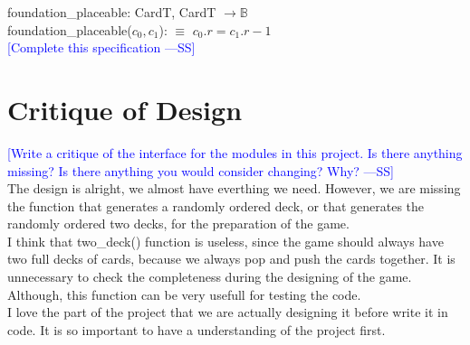 \documentclass[12pt]{article}
\newcommand{\authornote}[3]{\textcolor{#1}{[#3 ---#2]}}
\newcommand{\authornote}[3]{}
\newcommand{\wss}[1]{\authornote{blue}{SS}{#1}}
\begin{document}
\noindent foundation\_placeable: CardT, CardT $\rightarrow \mathbb{B}$ \\
\noindent foundation\_placeable($c_0, c_1$): $\equiv$ $c_0.r = c_1.r -1$ \\
\wss{Complete this specification}

\newpage

\section*{Critique of Design}

\wss{Write a critique of the interface for the modules in this project.  Is there
anything missing?  Is there anything you would consider changing?  Why?}\\

The design is alright, we almost have everthing we need. However, we are missing the 
function that generates a randomly ordered deck, or that generates the randomly ordered two 
decks, for the preparation of the game. \\I think that two\_deck() function is useless, 
since the game should always have two full decks of cards, because we 
always pop and push the cards together. It is unnecessary to check the 
completeness during the designing of the game. Although, this function can be very
 usefull for testing the code. \\I love the part of the project that we are actually 
designing it before write it in code. It is so important to have a understanding of the project first. 
\end{document}
